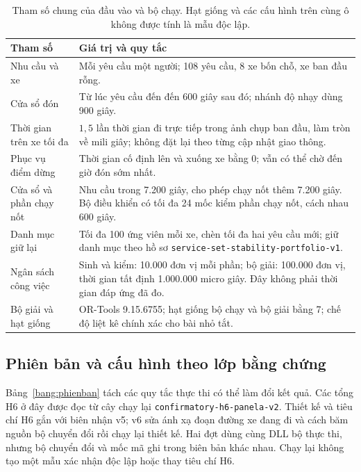 \begin{table}[htbp]
\centering
\caption{Tham số chung của đầu vào và bộ chạy. Hạt giống và các cấu hình
trên cùng ô không được tính là mẫu độc lập.}
\label{bang:thamso}
\small
\begin{tabularx}{\linewidth}{@{}>{\raggedright\arraybackslash}p{4.1cm}>{\raggedright\arraybackslash}X@{}}
\toprule
\textbf{Tham số} & \textbf{Giá trị và quy tắc}\\
\midrule
Nhu cầu và xe & Mỗi yêu cầu một người; 108 yêu cầu, 8 xe bốn chỗ, xe ban đầu rỗng.\\
Cửa sổ đón & Từ lúc yêu cầu đến đến 600 giây sau đó; nhánh độ nhạy dùng 900 giây.\\
Thời gian trên xe tối đa & $1{,}5$ lần thời gian đi trực tiếp trong ảnh chụp ban đầu,
làm tròn về mili giây; không đặt lại theo từng cập nhật giao thông.\\
Phục vụ điểm dừng & Thời gian cố định lên và xuống xe bằng 0; vẫn có thể chờ đến giờ đón sớm nhất.\\
Cửa sổ và phần chạy nốt & Nhu cầu trong 7.200 giây, cho phép chạy nốt thêm 7.200 giây.
Bộ điều khiển có tối đa 24 mốc kiểm phần chạy nốt, cách nhau 600 giây.\\
Danh mục giữ lại & Tối đa 100 ứng viên mỗi xe, chèn tối đa hai yêu cầu mới;
giữ danh mục theo hồ sơ \texttt{service-set-stability-portfolio-v1}.\\
Ngân sách công việc & Sinh và kiểm: 10.000 đơn vị mỗi phần; bộ giải: 100.000 đơn vị,
thời gian tất định 1.000.000 micro giây. Đây không phải thời gian đáp ứng đã đo.\\
Bộ giải và hạt giống & OR-Tools 9.15.6755; hạt giống bộ chạy và bộ giải bằng 7;
chế độ liệt kê chính xác cho bài nhỏ tắt.\\
\bottomrule
\end{tabularx}
\end{table}

\subsection{Phiên bản và cấu hình theo lớp bằng chứng}

Bảng~\ref{bang:phienban} tách các quy tắc thực thi có thể làm đổi kết quả.
Các tổng H6 ở đây được đọc từ cây chạy lại \texttt{confirmatory-h6-panela-v2}.
Thiết kế và tiêu chí H6 gắn với biên nhận v5; v6 sửa ánh xạ đoạn đường xe
đang đi và cách băm nguồn bộ chuyển đổi rồi chạy lại thiết kế. Hai đợt dùng
cùng DLL bộ thực thi, nhưng bộ chuyển đổi và mốc mã ghi trong biên bản khác
nhau. Chạy lại không tạo một mẫu xác nhận độc lập hoặc thay tiêu chí H6.

